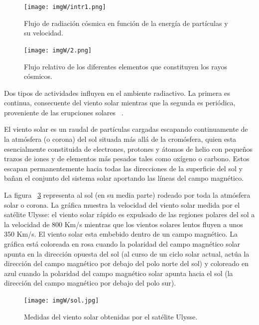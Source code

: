 \documentclass[a4paper,openright,12pt]{report}
\begin{document}
\begin{figure}[H]
	\centering
	\texttt{[image: imgW/intr1.png]}
	\caption{Flujo de radiación cósmica en función de la energía de  partículas y su velocidad.  } \cite{rayoss}
    
	\label{radiation}
\end{figure}

\begin{figure}[H]
	\centering
	\texttt{[image: imgW/2.png]}
	\caption{Flujo relativo de los diferentes elementos que constituyen los rayos cósmicos. }\cite{mansour2012methodes}
	\label{radiation2}
\end{figure}

Dos tipos de actividades influyen en el ambiente radiactivo. La primera es continua, consecuente del viento solar mientras que la segunda es periódica, proveniente de las erupciones solares ~\cite{boudenot1995}.

El viento solar es un raudal de partículas cargadas escapando continuamente de la atmósfera (o corona) del sol situada más allá de la cromósfera, quien esta esencialmente constituida de electrones,  protones y  átomos de helio con pequeños trazos de iones y de elementos más pesados tales como  oxígeno o  carbono. Estos  escapan permanentemente hacia todas las direcciones de la superficie del sol y bañan el conjunto del sistema solar aportando  las líneas del campo magnético.

\pagebreak

La figura ~\ref{sol} representa al sol (en su media parte) rodeado por toda la atmósfera solar o corona. La gráfica muestra la velocidad del viento solar medida por el satélite Ulysse: el viento solar rápido es expulsado de las regiones polares del sol a la velocidad de 800 Km/s mientras que los vientos solares lentos fluyen a unos 350 Km/s. El viento solar esta embebido  dentro de un campo magnético. La gráfica está coloreada en rosa cuando la polaridad del campo magnético solar apunta en la dirección opuesta del sol (al curso de un ciclo solar actual, actúa la dirección del campo magnético por 	debajo del polo norte del sol) y coloreado en azul cuando la polaridad del campo magnético solar apunta hacia el sol (la dirección del campo magnético por debajo del polo sur).







\begin{figure}[H]
	\centering
\texttt{[image: imgW/sol.jpg]}
	\caption{Medidas del viento solar obtenidas por el satélite Ulysse.} \cite{ESA}
	\label{sol}
\end{figure}
\end{document}
